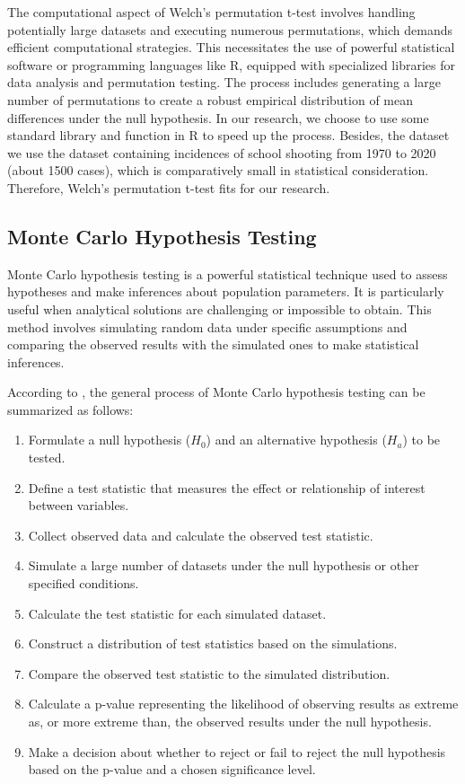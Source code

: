 \documentclass[12pt]{article}
\numberwithin{figure}{section}
\begin{document}
The computational aspect of Welch's permutation t-test involves handling potentially large datasets and executing numerous permutations, which demands efficient computational strategies. This necessitates the use of powerful statistical software or programming languages like R, equipped with specialized libraries for data analysis and permutation testing. The process includes generating a large number of permutations to create a robust empirical distribution of mean differences under the null hypothesis. In our research, we choose to use some standard library and function in R to speed up the process. Besides, the dataset we use the dataset containing incidences of school shooting from 1970 to 2020 (about 1500 cases), which is comparatively small in statistical consideration. Therefore, Welch's permutation t-test fits for our research. 

\subsection{Monte Carlo Hypothesis Testing}

Monte Carlo hypothesis testing is a powerful statistical technique used to assess hypotheses and make inferences about population parameters. It is particularly useful when analytical solutions are challenging or impossible to obtain. This method involves simulating random data under specific assumptions and comparing the observed results with the simulated ones to make statistical inferences.

According to \textcite{slides_mc}, the general process of Monte Carlo hypothesis testing can be summarized as follows:

\begin{enumerate}
    \item Formulate a null hypothesis ($H_0$) and an alternative hypothesis ($H_a$) to be tested.
    \item Define a test statistic that measures the effect or relationship of interest between variables.
    \item Collect observed data and calculate the observed test statistic.
    \item Simulate a large number of datasets under the null hypothesis or other specified conditions.
    \item Calculate the test statistic for each simulated dataset.
    \item Construct a distribution of test statistics based on the simulations.
    \item Compare the observed test statistic to the simulated distribution.
    \item Calculate a p-value representing the likelihood of observing results as extreme as, or more extreme than, the observed results under the null hypothesis.
    \item Make a decision about whether to reject or fail to reject the null hypothesis based on the p-value and a chosen significance level.
\end{enumerate}
\end{document}
